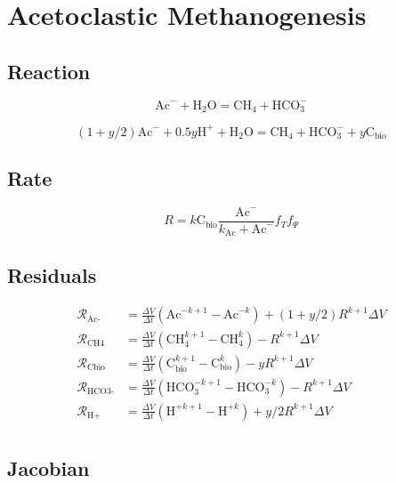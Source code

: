 \documentclass[12pt, a4paper]{article}
\begin{document}
\clearpage
\section{Acetoclastic Methanogenesis}
\subsection{Reaction}
\begin{equation}
\label{rxnam}
\text{Ac}^- +  \text{H}_2\text{O} =  \text{CH}_4 + \text{HCO}_3^-
\end{equation}

\begin{equation}
\label{rxnam}
(1 + y/2)\text{Ac}^- +  0.5y \text{H}^+ + \text{H}_2\text{O} =  \text{CH}_4 + \text{HCO}_3^- + y \text{C}_\text{bio}
\end{equation}

\subsection{Rate}
\begin{equation}
\label{amrate}
R =  k \text{C}_\text{bio} \frac{\text{Ac}^-}{k_\text{Ac} + \text{Ac}^-}  f_T f_\Psi
\end{equation}

\subsection{Residuals}
\begin{align*}
\mathcal{R}_{\text{Ac-}} & = \frac{\Delta V}{\Delta t} \left(\text{Ac}^{-k+1} - \text{Ac}^{-k}\right)  + (1+y/2) R^{k+1} \Delta V \\
\mathcal{R}_\text{CH4} & = \frac{\Delta V}{\Delta t} \left(\text{CH}_4^{k+1} - \text{CH}_4^k\right)  - R^{k+1} \Delta V \\
\mathcal{R}_\text{Cbio} & = \frac{\Delta V}{\Delta t} \left(\text{C}_\text{bio}^{k+1} - \text{C}_\text{bio}^k\right)  - y R^{k+1} \Delta V \\
\mathcal{R}_\text{HCO3-} & = \frac{\Delta V}{\Delta t} \left(\text{HCO}_3^{-k+1} - \text{HCO}_3^{-k}\right)  - R^{k+1} \Delta V \\
\mathcal{R}_\text{H+} & = \frac{\Delta V}{\Delta t} \left(\text{H}^{+k+1} - \text{H}^{+k}\right)  + y/2 R^{k+1} \Delta V \\
\end{align*}

\subsection{Jacobian}
\end{document}
